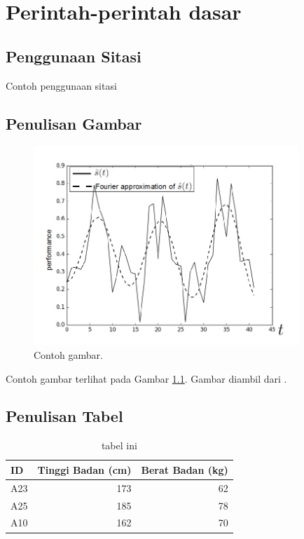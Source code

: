 \chapter{Perintah-perintah dasar}


\section{Penggunaan Sitasi}
Contoh penggunaan sitasi \cite{lukito2016,santosa2011user}
\cite{setiawan2014fuzzy} \cite{wibowo2014line} \cite{marenda2016digitory} \cite{wibirama2013dual,wibowo2016clustering}

\section{Penulisan Gambar}

\begin{figure}[h]
	\centering
	\includegraphics[width=10cm]{images/sample-fig.png}
	\caption{Contoh gambar.}
	\label{Fig: Contoh gambar}
\end{figure}

Contoh gambar terlihat pada Gambar \ref{Fig: Contoh gambar}. Gambar diambil dari \cite{wibowo2016clustering}.

\section{Penulisan Tabel}
\begin{table}[h]
	\caption{tabel ini}
	\vspace{0.5em}
	\centering
	\begin{tabular}{|l|r|r|}
		\hline
		ID & Tinggi Badan (cm) & Berat Badan (kg) \\
		\hline \hline
		A23 & 173 & 62 \\
		A25 & 185 & 78 \\
		A10 & 162 & 70 \\ \hline
	\end{tabular}
	\label{Tab: Tabel Tinggi Berat}
\end{table}

